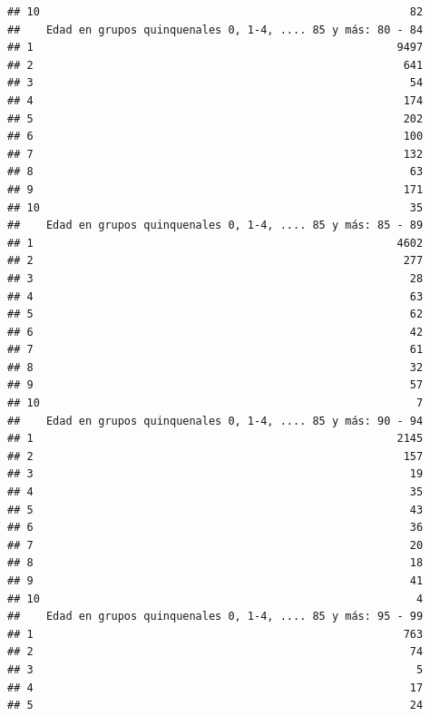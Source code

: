 \documentclass[11pt,]{article}
\begin{document}
\begin{verbatim}
## 10                                                         82
##    Edad en grupos quinquenales 0, 1-4, .... 85 y más: 80 - 84
## 1                                                        9497
## 2                                                         641
## 3                                                          54
## 4                                                         174
## 5                                                         202
## 6                                                         100
## 7                                                         132
## 8                                                          63
## 9                                                         171
## 10                                                         35
##    Edad en grupos quinquenales 0, 1-4, .... 85 y más: 85 - 89
## 1                                                        4602
## 2                                                         277
## 3                                                          28
## 4                                                          63
## 5                                                          62
## 6                                                          42
## 7                                                          61
## 8                                                          32
## 9                                                          57
## 10                                                          7
##    Edad en grupos quinquenales 0, 1-4, .... 85 y más: 90 - 94
## 1                                                        2145
## 2                                                         157
## 3                                                          19
## 4                                                          35
## 5                                                          43
## 6                                                          36
## 7                                                          20
## 8                                                          18
## 9                                                          41
## 10                                                          4
##    Edad en grupos quinquenales 0, 1-4, .... 85 y más: 95 - 99
## 1                                                         763
## 2                                                          74
## 3                                                           5
## 4                                                          17
## 5                                                          24

\end{verbatim}
\end{document}
